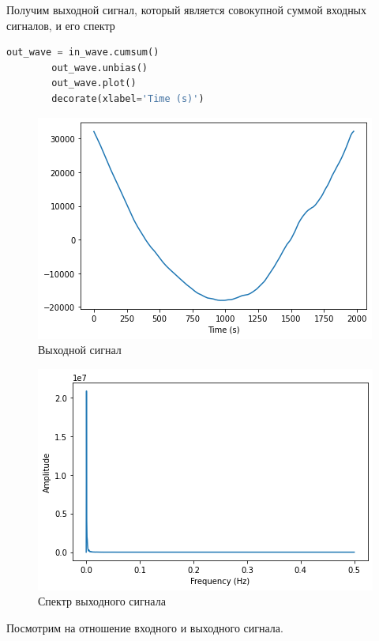 \documentclass[a4paper, 14pt]{extarticle}
\begin{document}
    Получим выходной сигнал, который является совокупной суммой входных сигналов, и его спектр

    \begin{lstlisting}[language=Python, caption= Получение выходного сигнала, label={lst:make_output}]
        out_wave = in_wave.cumsum()
        out_wave.unbias()
        out_wave.plot()
        decorate(xlabel='Time (s)')
    \end{lstlisting}

    \begin{figure}[H]
        \centering
        \includegraphics[width=0.8\linewidth]{signal_cumsum}
        \caption{Выходной сигнал}
        \label{fig:signal_cumsum}
    \end{figure}

    \begin{figure}[H]
        \centering
        \includegraphics[width=0.8\linewidth]{signal_cumsum_spectrum}
        \caption{Спектр выходного сигнала}
        \label{fig:signal_cumsum_spectrum}
    \end{figure}

    Посмотрим на отношение входного и выходного сигнала.
\end{document}
